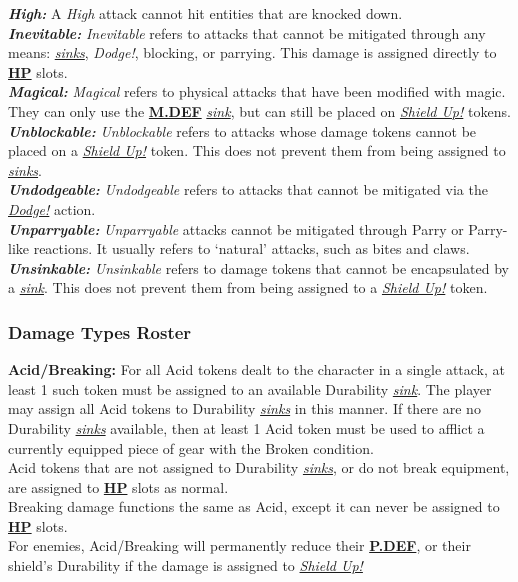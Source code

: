 \documentclass[12pt]{article}
\newcommand{\refto}[1]{\hyperlink{#1}{\textbf{#1}}}
\newcommand{\reftoit}[1]{\hyperlink{#1}{\emph{#1}}}
\newcommand{\makerefit}[1]{\hypertarget{#1}{\emph{#1}}}
\begin{document}
\begin{multicols*}{2}
\textbf{\emph{High:}} A \makerefit{High} attack cannot hit entities that are knocked down.\\

\textbf{\emph{Inevitable:}} \makerefit{Inevitable} refers to attacks that cannot be mitigated through any means: \reftoit{sinks}, \emph{Dodge!}, blocking, or parrying. This damage is assigned directly to \refto{HP} slots.\\

\textbf{\emph{Magical:}} \makerefit{Magical} refers to physical attacks that have been modified with magic. They can only use the \refto{M.DEF} \reftoit{sink}, but can still be placed on \reftoit{Shield Up!} tokens.\\

\textbf{\emph{Unblockable:}} \makerefit{Unblockable} refers to attacks whose damage tokens cannot be placed on a \reftoit{Shield Up!} token. This does not prevent them from being assigned to \reftoit{sinks}.\\

\textbf{\emph{Undodgeable:}} \makerefit{Undodgeable} refers to attacks that cannot be mitigated via the \reftoit{Dodge!} action.\\

\textbf{\emph{Unparryable:}} \makerefit{Unparryable} attacks cannot be mitigated through Parry or Parry-like reactions. It usually refers to ‘natural’ attacks, such as bites and claws.\\

\textbf{\emph{Unsinkable:}} \makerefit{Unsinkable} refers to damage tokens that cannot be encapsulated by a \reftoit{sink}. This does not prevent them from being assigned to a \reftoit{Shield Up!} token.

\subsubsection{Damage Types Roster}
\textbf{Acid/Breaking:} For all Acid tokens dealt to the character in a single attack, at least 1 such token must be assigned to an available Durability \reftoit{sink}. The player may assign all Acid tokens to Durability \reftoit{sinks} in this manner. If there are no Durability \reftoit{sinks} available, then at least 1 Acid token must be used to afflict a currently equipped piece of gear with the Broken condition.\\
Acid tokens that are not assigned to Durability \reftoit{sinks}, or do not break equipment, are assigned to \refto{HP} slots as normal.\\
Breaking damage functions the same as Acid, except it can never be assigned to \refto{HP} slots.\\
For enemies, Acid/Breaking will permanently reduce their \refto{P.DEF}, or their shield’s Durability if the damage is assigned to \reftoit{Shield Up!}\\


\end{multicols*}
\end{document}
